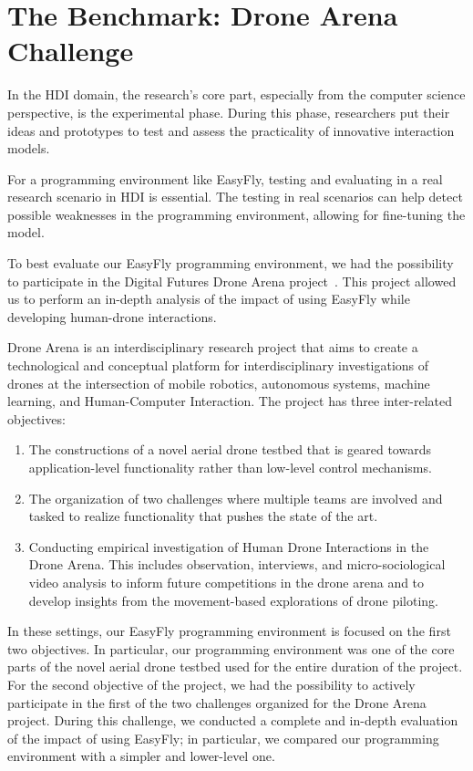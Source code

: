 \section{The Benchmark: Drone Arena Challenge}\label{sec:the_benchmark}
In the HDI domain, the research's core part, especially from the computer science perspective,
is the experimental phase. During this phase, researchers put their ideas and prototypes to test
and assess the practicality of innovative interaction models.

For a programming environment like EasyFly, testing and evaluating in a real research scenario in HDI is essential. 
The testing in real scenarios can help detect possible weaknesses in the programming environment, allowing for fine-tuning the model.

To best evaluate our EasyFly programming environment, we had the possibility to participate in the Digital Futures Drone Arena project~\cite{dronearena}.
This project allowed us to perform an in-depth analysis of the impact of using EasyFly while developing human-drone interactions. 

Drone Arena is an interdisciplinary research project that aims to create a technological and conceptual platform for interdisciplinary investigations of drones at the intersection of mobile robotics,
 autonomous systems, machine learning, and Human-Computer Interaction.
The project has three inter-related objectives:
\begin{enumerate}
    \item   The constructions of a novel aerial drone testbed that is geared towards application-level
            functionality rather than low-level control mechanisms.
    \item   The organization of two challenges where multiple teams are involved and tasked to realize
            functionality that pushes the state of the art.
    \item   Conducting empirical investigation of Human Drone Interactions in the Drone Arena.
            This includes observation, interviews, and micro-sociological video analysis to inform future
            competitions in the drone arena and to develop insights from the movement-based explorations of drone piloting.
\end{enumerate}

In these settings, our EasyFly programming environment is focused on the first two objectives.
In particular, our programming environment was one of the core parts of the novel aerial drone testbed used for the entire duration of the project. 
For the second objective of the project, we had the possibility to actively participate in the first of the two challenges organized for the Drone Arena project. 
During this challenge, we conducted a complete and in-depth evaluation of the impact of using EasyFly; 
in particular, we compared our programming environment with a simpler and lower-level one.


